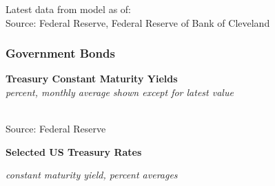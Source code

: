 \documentclass{report}
\makeatletter
\newcommand{\tbllink}[1]{\href{https://raw.githubusercontent.com/bdecon/US-chartbook/master/chartbook/data/#1}{\faTable}}
\newcommand*\short[1]{\expandafter\@gobbletwo\number\numexpr#1\relax}
\newcommand{\absnode}[3]{\node[below right, align=left] at (axis cs: #1,#2) {#3};}
\newcommand{\dateaxisticks}{
		date coordinates in=x, axis line style={draw=none},
		xmax={2022-10-31},
		max space between ticks=40,	    
		xtick={{1990-01-01}, {1992-01-01}, {1994-01-01}, 
			{1996-01-01}, {1998-01-01}, {2000-01-01}, 
			{2002-01-01}, {2004-01-01}, {2006-01-01},
			{2008-01-01}, {2010-01-01}, {2012-01-01}, {2014-01-01},
		    {2016-01-01}, {2018-01-01}, {2020-01-01}, {2022-01-01}, 
		    {2024-01-01}, {2026-01-01}},
		minor xtick={{1989-01-01}, {1991-01-01}, {1993-01-01},
			{1995-01-01}, {1997-01-01}, {1999-01-01}, 
			{2001-01-01}, {2003-01-01}, {2005-01-01}, {2007-01-01},
		    {2009-01-01}, {2011-01-01}, {2013-01-01}, {2015-01-01},
		    {2017-01-01}, {2019-01-01}, {2021-01-01}, {2023-01-01}, 
		    {2025-01-01}, {2027-01-01}},
		enlarge y limits={0.06}, enlarge x limits={0.01},
		}
\newcommand{\bbar}[2]{extra #1 ticks = {{#2}}, extra #1 tick labels = ,
		extra #1 tick style = {grid=major, grid style={thick, black!25}},}
\newcommand{\stdline}[4]{\addplot[very thick, no markers, color=#1] 
		table [x=#2, y=#3, col sep=comma] {#4};	}
\newcommand{\rbars}{
		\fill[color=black!10] (axis cs:{1990-07-01},\pgfkeysvalueof{/pgfplots/ymin}) rectangle 
			(axis cs:{1991-03-01}, \pgfkeysvalueof{/pgfplots/ymax});
		\fill[color=black!10] (axis cs:{2007-12-01},\pgfkeysvalueof{/pgfplots/ymin}) rectangle 
			(axis cs:{2009-07-01}, \pgfkeysvalueof{/pgfplots/ymax});
		\fill[color=black!10] (axis cs:{2001-03-01},\pgfkeysvalueof{/pgfplots/ymin}) rectangle 
			(axis cs:{2001-11-01}, \pgfkeysvalueof{/pgfplots/ymax});
		\fill[color=black!10] (axis cs:{2020-02-01},\pgfkeysvalueof{/pgfplots/ymin}) rectangle 
			(axis cs:{2020-05-01}, \pgfkeysvalueof{/pgfplots/ymax});}
\makeatother
\begin{document}
{\begin{minipage}{0.76\textwidth}
\footnotesize{Latest data from model as of: {}}\\
\footnotesize{Source: Federal Reserve, Federal Reserve of Bank of Cleveland} \hfill \tbllink{inf_exp_ch.csv}
\end{minipage}
\newpage
\begin{minipage}{0.76\textwidth}
\subsubsection*{Government Bonds}
\small  
\vspace{1mm}

\normalsize \textbf{Treasury Constant Maturity Yields}\\
\footnotesize{\textit{percent, monthly average shown except for latest value }}\\
\hspace*{-2mm} \\
\footnotesize{Source: Federal Reserve} \hfill \tbllink{rates.csv}
\vspace{3mm}

\normalsize \textbf{Selected US Treasury Rates}\\
\footnotesize{\textit{constant maturity yield, percent \hspace{18mm}averages}\\
\hspace*{-3mm}  \setlength{\tabcolsep}{2.0pt} \color{black!90}
		{\renewcommand{\arraystretch}{1.55}
\begin{tabular}{p{17mm} R{10.2mm} R{10.2mm} R{10.2mm} R{9.5mm}
		 		 R{9.5mm} R{9.5mm} R{9.5mm} R{9.5mm} R{9.5mm}}
			  \hline
		\end{tabular}}}


\end{minipage}}
\end{document}
